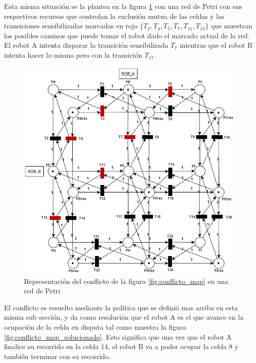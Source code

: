 Esta misma situación se la plantea en la figura \ref{fig:rdp_no_grid_conflicto} con una red de Petri con sus respectivos recursos que controlan la exclusión mutua de las celdas y las transiciones sensibilizadas marcadas en rojo $\{T_2, T_4, T_5, T_7, T_{11}, T_{13}\}$ que muestran los posibles caminos que puede tomar el robot dado el marcado actual de la red. El robot A intenta disparar la transición sensibilizada $T_7$ mientras que el robot B intenta hacer lo mismo pero con la transición $T_{11}$.

\begin{figure}[H]
    \centering
    \includegraphics[width=0.8\linewidth]{images/rdp_no_grid_conflicto.png}
    \caption{Representación del conflicto de la figura \ref{fig:conflicto_map} en una red de Petri}
    \label{fig:rdp_no_grid_conflicto}
\end{figure}

El conflicto es resuelto mediante la política que se definió mas arriba en esta misma sub sección, y da como resolución que el robot A es el que avance en la ocupación de la celda en disputa tal como muestra la figura \ref{fig:conflicto_map_solucionado}. Esto significa que una vez que el robot A finalice su recorrido en la celda $14$, el robot B va a poder ocupar la celda $8$ y también terminar con su recorrido.

